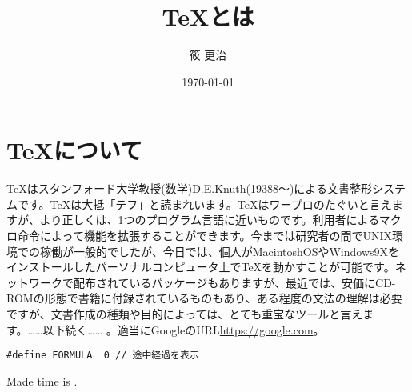 \documentclass[twocolumn,10pt]{jarticle}
\title{\TeX とは}
\author{筱 更治}
\date{\today}
\begin{document}
 
\maketitle 
\section{\TeX について}

TeXはスタンフォード大学教授(数学)D.E.Knuth(19388～)による文書整形システムです。TeXは大抵「テフ」と読まれいます。TeXはワープロのたぐいと言えますが、より正しくは、1つのプログラム言語に近いものです。利用者によるマクロ命令によって機能を拡張することができます。今までは研究者の間でUNIX環境での稼働が一般的でしたが、今日では、個人がMacintoshOSやWindows9Xをインストールしたパーソナルコンピュータ上でTeXを動かすことが可能です。ネットワークで配布されているパッケージもありますが、最近では、安価にCD-ROMの形態で書籍に付録されているものもあり、ある程度の文法の理解は必要ですが、文書作成の種類や目的によっては、とても重宝なツールと言えます。……以下続く…… 。適当にGoogleのURL\url{https://google.com}。

\begin{lstlisting}[caption=FORMURAの定義]
#define FORMULA  0 // 途中経過を表示
\end{lstlisting}
Made time is  \pdfcreationdate .


\end{document}
